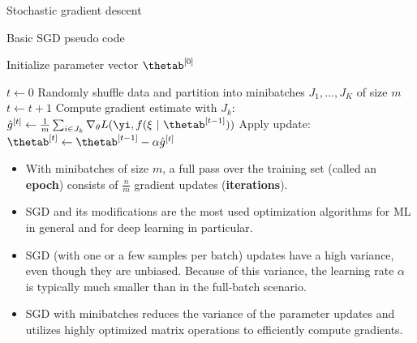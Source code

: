 
\begin{vbframe}{Stochastic gradient descent}

  \begin{algorithm}[H]
  \footnotesize
    \caption{Basic SGD pseudo code}
    \begin{algorithmic}[1]
    \State Initialize parameter vector $\thetab^{[0]}$ 
    
    \State $t \leftarrow 0$
    \State Randomly shuffle data and partition into minibatches $J_1, ..., J_K$ of size $m$
      \State $t \leftarrow t + 1$ 
      \State Compute gradient estimate with $J_k$: $\hat{g}^{[t]} \leftarrow \frac{1}{m} \sum_{i \in J_k} \nabla_\theta L(\yi, f(\xi ~|~ \thetab^{[t-1]})) $
      \State Apply update: $\thetab^{[t]} \leftarrow \thetab^{[t-1]} - \alpha \hat{g}^{[t]}$
      
      \EndFor
    
        
      \EndWhile
    \end{algorithmic}
  \end{algorithm}
 
\framebreak


\vspace*{0.5cm}
  \begin{itemize}
    \item With minibatches of size $m$, a full pass over the training set (called an \textbf{epoch}) consists of $\frac{n}{m}$ gradient updates (\textbf{iterations}).
    \item SGD and its modifications are the most used optimization algorithms for ML in general and for deep learning in particular.
    \item SGD (with one or a few samples per batch) updates have a high variance, even though they are unbiased. 
      Because of this variance, the learning rate $\alpha$ is typically much smaller than in the full-batch scenario.
    \item SGD with minibatches reduces the variance of the parameter updates and utilizes highly optimized matrix operations to efficiently compute gradients.
   \end{itemize}


\end{vbframe}
